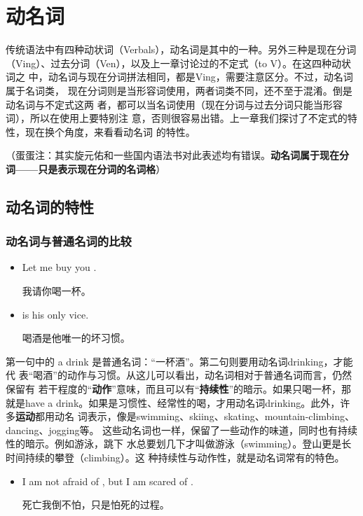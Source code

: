 \chapter{动名词}

传统语法中有四种动状词（Verbals），动名词是其中的一种。另外三种是现在分词
（Ving）、过去分词（Ven），以及上一章讨论过的不定式（to V）。在这四种动状词之
中，动名词与现在分词拼法相同，都是Ving，需要注意区分。不过，动名词属于名词类，
现在分词则是当形容词使用，两者词类不同，还不至于混淆。倒是动名词与不定式这两
者，都可以当名词使用（现在分词与过去分词只能当形容词），所以在使用上要特别注
意，否则很容易出错。上一章我们探讨了不定式的特性，现在换个角度，来看看动名词
的特性。

（蛋蛋注：其实旋元佑和一些国内语法书对此表述均有错误。\textbf{动名词属于现在分
  词——只是表示现在分词的名词格}）

\section{动名词的特性}

\subsection{动名词与普通名词的比较}

\begin{itemize}
\item Let me buy you .

  我请你喝一杯。
\item {} is his only vice.

  喝酒是他唯一的坏习惯。
\end{itemize}

第一句中的 a drink 是普通名词：“一杯酒”。第二句则要用动名词drinking，才能代
表“喝酒”的动作与习惯。从这儿可以看出，动名词相对于普通名词而言，仍然保留有
若干程度的“\textbf{动作}”意味，而且可以有“\textbf{持续性}”的暗示。如果只喝一杯，那就是have
a drink。如果是习惯性、经常性的喝，才用动名词drinking。此外，许多\textbf{运动}都用动名
词表示，像是swimming、skiing、skating、mountain-climbing、dancing、jogging等。
这些动名词也一样，保留了一些动作的味道，同时也有持续性的暗示。例如游泳，跳下
水总要划几下才叫做游泳（swimming）。登山更是长时间持续的攀登（climbing）。这
种持续性与动作性，就是动名词常有的特色。

\begin{itemize}
\item I am not afraid of , but I am scared of .

  死亡我倒不怕，只是怕死的过程。
\end{itemize}

